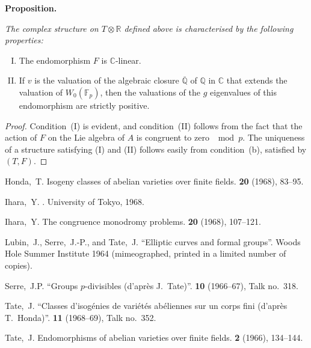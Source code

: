 \documentclass{article}
\newcommand{\FF}{\mathbb{F}}
\newcommand{\QQ}{\mathbb{Q}}
\newcommand{\RR}{\mathbb{R}}
\newcommand{\CC}{\mathbb{C}}
\newcommand{\oldpage}[1]{\marginpar{\footnotesize$\Big\vert$ \textit{p.~#1}}}
\begin{document}
\textbf{Proposition.}
{\itshape
  The complex structure on $T\otimes\RR$ defined above is characterised by the following properties:
  \begin{enumerate}[(I)]
    \item The endomorphism $F$ is $\CC$-linear.
    \item If $v$ is the valuation of the algebraic closure $\overline{\QQ}$ of $\QQ$ in $\CC$ that extends the valuation of $W_0(\FF_p)$, then the valuations of the $g$ eigenvalues of this endomorphism are strictly positive.
  \end{enumerate}
}

\begin{proof}
  Condition~(I) is evident, and condition~(II) follows from the fact that the action of $F$ on the Lie algebra of $A$ is congruent to zero $\mod p$.
  The uniqueness of a structure satisfying (I) and (II) follows easily from condition~(b), satisfied by $(T,F)$.
\end{proof}

\oldpage{243}


\nocite{*}

\begin{thebibliography}{7}

  {\sc Honda,~T.}
  \newblock Isogeny classes of abelian varieties over finite fields.
   \textbf{20} (1968), 83--95.

  {\sc Ihara,~Y.}
  .
  \newblock University of Tokyo, 1968.

  {\sc Ihara,~Y.}
  \newblock The congruence monodromy problems.
   \textbf{20} (1968), 107--121.

  {\sc Lubin,~J., Serre,~J.-P., and Tate,~J.}
  \newblock ``Elliptic curves and formal groups''.
  \newblock Woods Hole Summer Institute 1964 (mimeographed, printed in a limited number of copies).

  {\sc Serre,~J.P.}
  \newblock ``Groups $p$-divisibles (d'apr\`{e}s J.~Tate)''.
   \textbf{10} (1966--67), Talk no.~318.

  {\sc Tate,~J.}
  \newblock ``Classes d'isog\'{e}nies de vari\'{e}t\'{e}s ab\'{e}liennes sur un corps fini (d'apr\`{e}s T.~Honda)''.
   \textbf{11} (1968--69), Talk no.~352.

  {\sc Tate,~J.}
  \newblock Endomorphisms of abelian varieties over finite fields.
   \textbf{2} (1966), 134--144.

\end{thebibliography}
\end{document}
